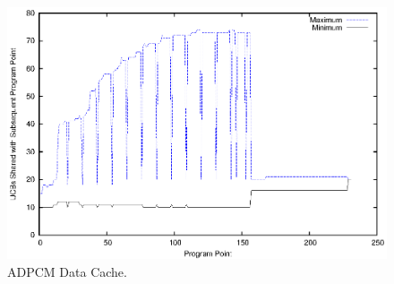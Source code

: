 \begin{figure}[h!]
\vspace{-10pt}
\begin{center}
\includegraphics[width=\linewidth]{eps/adpcm-dcache.eps}
\caption{ADPCM Data Cache.}
\label{fig:adpcm_data_cache}
\end{center}
\vspace{-10pt}
\end{figure}
%
%
%
%
%
%
%
